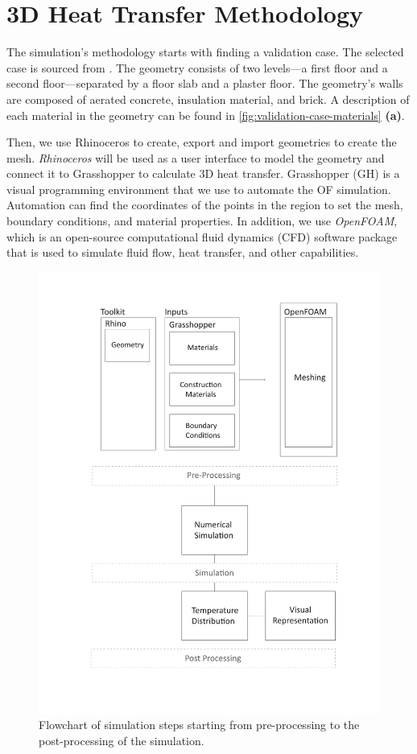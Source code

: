 
\chapter{3D Heat Transfer Methodology}

The simulation's methodology starts with finding a validation case. The selected case is sourced from \cite{ISO}. The geometry consists of two levels—a first floor and a second floor—separated by a floor slab and a plaster floor. The geometry's walls are composed of aerated concrete, insulation material, and brick.
A description of each material in the geometry can be found in \ref{fig:validation-case-materials} \textbf{(a)}.



Then, we use Rhinoceros to create, export and import geometries to create the mesh. 
\textit{Rhinoceros} will be used as a user interface to model the geometry and connect it to Grasshopper to calculate 3D heat transfer.
Grasshopper (GH) is a visual programming environment that we use to automate the OF simulation. Automation can find the coordinates of the points in the region to set the mesh, boundary conditions, and material properties. 
In addition, we use \textit{OpenFOAM}, which is an open-source computational fluid dynamics (CFD) software package that is used to simulate fluid flow, heat transfer, and other capabilities. 


   
\begin{figure}[H]
     \centering
    \includegraphics[trim=2.7cm 1.7cm 2.7cm 1.5cm, clip, width=0.7\linewidth]{Figures/flowchartv.pdf}
     \caption[Simulation Flowchart]{Flowchart of simulation steps starting from pre-processing to the post-processing of the simulation.}
   \label{fig:flowchart}
 \end{figure}



